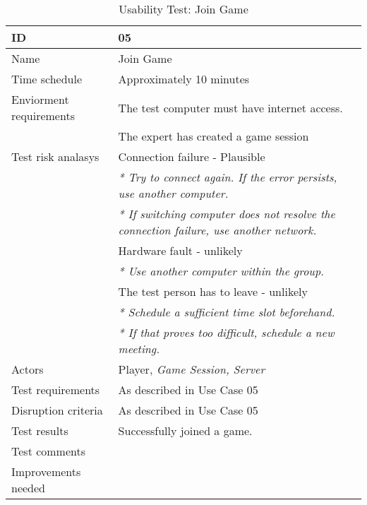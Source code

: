 {\footnotesize
\begin{table}[H]
\begin{tabular}{| p{5cm} | p{10cm} |}\hline
	\textbf{ID}	& \textbf{05} \\ \hline
	Name		& Join Game\\ \hline
	Time schedule	& Approximately 10 minutes\\ \hline
	Enviorment requirements 
		& The test computer must have internet access. \\ 
		& The expert has created a game session\\ \hline
	Test risk analasys 
		& Connection failure - Plausible \\
		& \emph{* Try to connect again. If the error persists, use another computer.} \\
		& \emph{* If switching computer does not resolve the connection failure, use another network.}\\
		& Hardware fault - unlikely \\
		& \emph{* Use another computer within the group.} \\
		& The test person has to leave - unlikely \\
		& \emph{* Schedule a sufficient time slot beforehand.} \\
		& \emph{* If that proves too difficult, schedule a new meeting.}\\ \hline
	Actors	& Player, \emph{Game Session, Server}\\ \hline
	Test requirements & As described in Use Case 05 \\ \hline
	Disruption criteria & As described in Use Case 05  \\ \hline
	Test results & Successfully joined a game.
		& \\ \hline
	Test comments
		& \\ \hline
	Improvements needed
		& \\ \hline
\end{tabular}


\caption{Usability Test: Join Game}
\label{fig:usability_test_5}
\end{table}}



